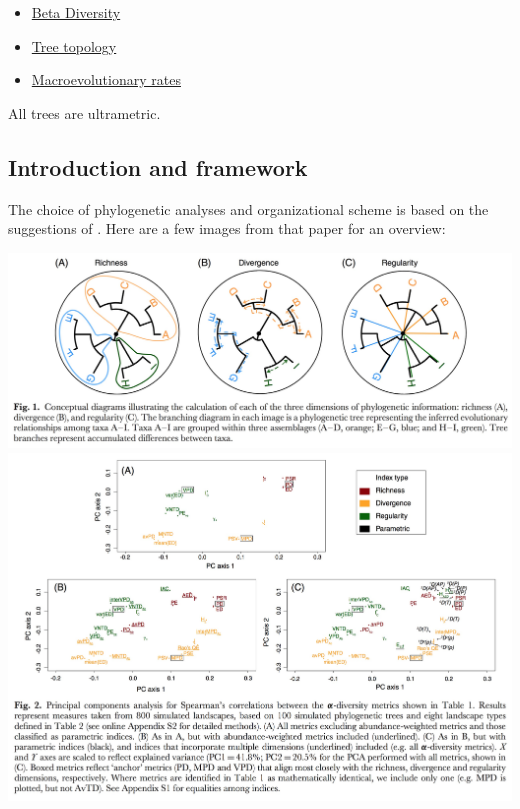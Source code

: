 \documentclass[]{book}
\providecommand{\tightlist}{%
  \setlength{\itemsep}{0pt}\setlength{\parskip}{0pt}}
\theoremstyle{definition}
\theoremstyle{definition}
\theoremstyle{definition}
\theoremstyle{remark}
\begin{document}
\begin{itemize}
\tightlist
\item
  \protect\hyperlink{beta-diversity}{Beta Diversity}
\item
  \protect\hyperlink{tree-topology}{Tree topology}
\item
  \protect\hyperlink{macroevolutionary-rates}{Macroevolutionary rates}
\end{itemize}

All trees are ultrametric.

\subsection{Introduction and
framework}\label{introduction-and-framework}

The choice of phylogenetic analyses and organizational scheme is based
on the suggestions of \citet{Tucker2016}. Here are a few images from
that paper for an overview:

\includegraphics{Images/Tucker_2016/tree_concept.jpg}
\includegraphics{Images/Tucker_2016/alpha_PCA.jpg}
\end{document}
